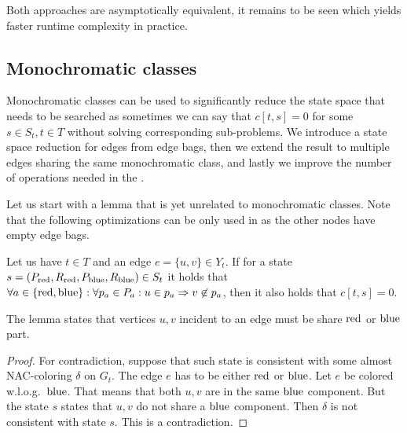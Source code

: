 Both approaches are asymptotically equivalent,
it remains to be seen which yields faster runtime complexity in practice.



\subsection{Monochromatic classes}

Monochromatic classes can be used to significantly reduce the state space
that needs to be searched as sometimes we can say that
\( c[t, s] = 0 \) for some \( s \in S_t, t \in T \)
without solving corresponding sub-problems.
%
We introduce a state space reduction for edges from edge bags,
then we extend the result to multiple edges
sharing the same monochromatic class,
and lastly we improve the number of
operations needed in the \IntroduceVertexWithEdgesNode{}.

Let us start with a lemma that is yet unrelated to monochromatic classes.
Note that the following optimizations can be only used in \IntroduceEdgeNode{}
as the other nodes have empty edge bags.
%
\begin{lemma}
	Let us have \( t \in T \) and an edge \( e = \{u, v\} \in Y_t \).
	If for a state \( s = (P_{\text{red}}, R_{\text{red}}, P_{\text{blue}}, R_{\text{blue}}) \in S_t \)
	it holds that
	\( {\forall a \in \{\text{red}, \text{blue}\}} : {\forall p_a \in P_a} : {u \in p_a \Rightarrow v \not\in p_a} \),
	then it also holds that \( c[t, s] = 0 \).
\end{lemma}
%
The lemma states that vertices \( u, v \) incident to an edge must
be share \( \text{red} \) or \( \text{blue} \) part.
%
\begin{proof}
	For contradiction, suppose that such state is consistent
	with some almost NAC-coloring \( \delta \) on \( G_t \).
	The edge \( e \) has to be either \( \text{red} \) or \( \text{blue} \).
	Let \( e \) be colored w.l.o.g.\ \( \text{blue} \).
	That means that both \( u, v \) are in the same \( \text{blue} \) component.
	But the state \( s \) states that \( u, v \) do not share a \( \text{blue} \) component.
	Then \( \delta \) is not consistent with state \( s \).
	This is a contradiction.
\end{proof}
%

